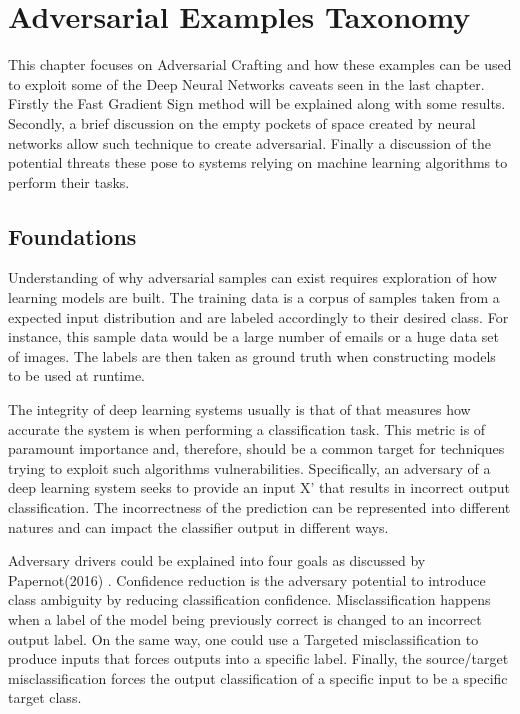 \chapter{Adversarial Examples Taxonomy}

This chapter focuses on Adversarial Crafting and how these examples can be used to exploit some of the Deep Neural Networks caveats seen in the last chapter. Firstly the Fast Gradient Sign method will be explained along with some results. Secondly, a brief discussion on the empty pockets of space created by neural networks allow such technique to create adversarial. Finally a discussion of the potential threats these pose to systems relying on machine learning algorithms to perform their tasks.


\section{Foundations}

Understanding of why adversarial samples can exist requires exploration of how learning models are built. The training data is a corpus of samples taken from a expected input distribution and are labeled accordingly to their desired class. For instance, this sample data would be a large number of emails or a huge data set of images. The labels are then taken as ground truth when constructing models to be used at runtime.

The integrity of deep learning systems usually is that of that measures how accurate the system is when performing a classification task. This metric is of paramount importance and, therefore, should be a common target for techniques trying to exploit such algorithms vulnerabilities. Specifically, an adversary of a deep learning system seeks to provide an input X' that results in incorrect output classification. The incorrectness of the prediction can be represented into different natures and can impact the classifier output in different ways.

Adversary drivers could be explained into four goals as discussed by Papernot(2016) \cite{papernot_thesis_2016}. Confidence reduction is the adversary potential to introduce class ambiguity by reducing classification confidence. Misclassification happens when a label of the model being previously correct is changed to an incorrect output label. On the same way, one could use a Targeted misclassification to produce inputs that forces outputs into a specific label. Finally, the source/target misclassification forces the output classification of a specific input to be a specific target class.

